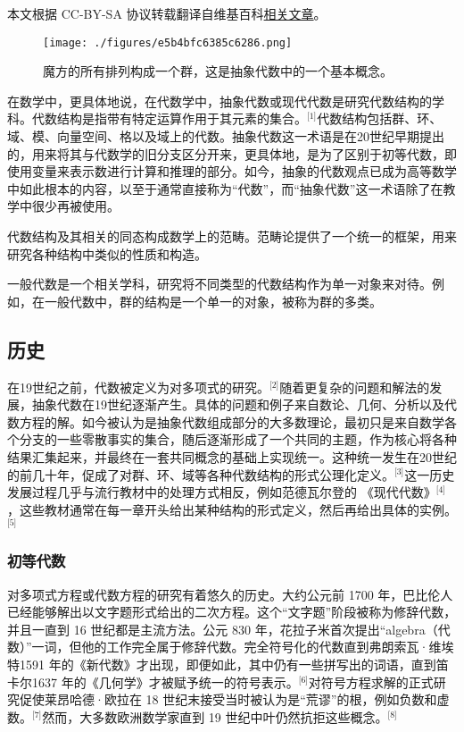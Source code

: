 
本文根据 CC-BY-SA 协议转载翻译自维基百科\href{https://en.wikipedia.org/wiki/Abstract_algebra}{相关文章}。

\begin{figure}[ht]
\centering
\texttt{[image: ./figures/e5b4bfc6385c6286.png]}
\caption{魔方的所有排列构成一个群，这是抽象代数中的一个基本概念。} \label{fig_CXds_1}
\end{figure}
在数学中，更具体地说，在代数学中，抽象代数或现代代数是研究代数结构的学科。代数结构是指带有特定运算作用于其元素的集合。\(^\text{[1]}\)代数结构包括群、环、域、模、向量空间、格以及域上的代数。抽象代数这一术语是在20世纪早期提出的，用来将其与代数学的旧分支区分开来，更具体地，是为了区别于初等代数，即使用变量来表示数进行计算和推理的部分。如今，抽象的代数观点已成为高等数学中如此根本的内容，以至于通常直接称为“代数”，而“抽象代数”这一术语除了在教学中很少再被使用。

代数结构及其相关的同态构成数学上的范畴。范畴论提供了一个统一的框架，用来研究各种结构中类似的性质和构造。

一般代数是一个相关学科，研究将不同类型的代数结构作为单一对象来对待。例如，在一般代数中，群的结构是一个单一的对象，被称为群的多类。
\subsection{历史}
在19世纪之前，代数被定义为对多项式的研究。\(^\text{[2]}\)随着更复杂的问题和解法的发展，抽象代数在19世纪逐渐产生。具体的问题和例子来自数论、几何、分析以及代数方程的解。如今被认为是抽象代数组成部分的大多数理论，最初只是来自数学各个分支的一些零散事实的集合，随后逐渐形成了一个共同的主题，作为核心将各种结果汇集起来，并最终在一套共同概念的基础上实现统一。这种统一发生在20世纪的前几十年，促成了对群、环、域等各种代数结构的形式公理化定义。\(^\text{[3]}\)这一历史发展过程几乎与流行教材中的处理方式相反，例如范德瓦尔登的 《现代代数》\(^\text{[4]}\)，这些教材通常在每一章开头给出某种结构的形式定义，然后再给出具体的实例。\(^\text{[5]}\)
\subsubsection{初等代数}
对多项式方程或代数方程的研究有着悠久的历史。大约公元前 1700 年，巴比伦人已经能够解出以文字题形式给出的二次方程。这个“文字题”阶段被称为修辞代数，并且一直到 16 世纪都是主流方法。公元 830 年，花拉子米首次提出“algebra（代数）”一词，但他的工作完全属于修辞代数。完全符号化的代数直到弗朗索瓦·维埃特1591 年的《新代数》才出现，即便如此，其中仍有一些拼写出的词语，直到笛卡尔1637 年的《几何学》才被赋予统一的符号表示。\(^\text{[6]}\)对符号方程求解的正式研究促使莱昂哈德·欧拉在 18 世纪末接受当时被认为是“荒谬”的根，例如负数和虚数。\(^\text{[7]}\)然而，大多数欧洲数学家直到 19 世纪中叶仍然抗拒这些概念。\(^\text{[8]}\)

